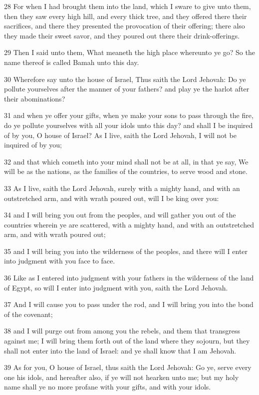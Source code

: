 \par 28 For when I had brought them into the land, which I sware to give unto them, then they saw every high hill, and every thick tree, and they offered there their sacrifices, and there they presented the provocation of their offering; there also they made their sweet savor, and they poured out there their drink-offerings.
\par 29 Then I said unto them, What meaneth the high place whereunto ye go? So the name thereof is called Bamah unto this day.
\par 30 Wherefore say unto the house of Israel, Thus saith the Lord Jehovah: Do ye pollute yourselves after the manner of your fathers? and play ye the harlot after their abominations?
\par 31 and when ye offer your gifts, when ye make your sons to pass through the fire, do ye pollute yourselves with all your idols unto this day? and shall I be inquired of by you, O house of Israel? As I live, saith the Lord Jehovah, I will not be inquired of by you;
\par 32 and that which cometh into your mind shall not be at all, in that ye say, We will be as the nations, as the families of the countries, to serve wood and stone.
\par 33 As I live, saith the Lord Jehovah, surely with a mighty hand, and with an outstretched arm, and with wrath poured out, will I be king over you:
\par 34 and I will bring you out from the peoples, and will gather you out of the countries wherein ye are scattered, with a mighty hand, and with an outstretched arm, and with wrath poured out;
\par 35 and I will bring you into the wilderness of the peoples, and there will I enter into judgment with you face to face.
\par 36 Like as I entered into judgment with your fathers in the wilderness of the land of Egypt, so will I enter into judgment with you, saith the Lord Jehovah.
\par 37 And I will cause you to pass under the rod, and I will bring you into the bond of the covenant;
\par 38 and I will purge out from among you the rebels, and them that transgress against me; I will bring them forth out of the land where they sojourn, but they shall not enter into the land of Israel: and ye shall know that I am Jehovah.
\par 39 As for you, O house of Israel, thus saith the Lord Jehovah: Go ye, serve every one his idols, and hereafter also, if ye will not hearken unto me; but my holy name shall ye no more profane with your gifts, and with your idols.
